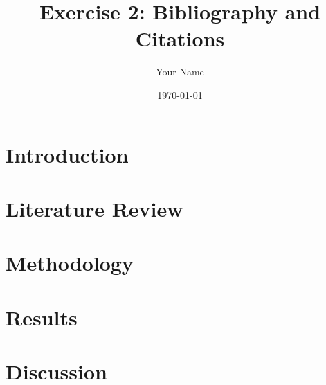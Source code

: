 \documentclass{article}
\title{Exercise 2: Bibliography and Citations}
\author{Your Name}
\date{\today}
\begin{document}
\maketitle

\section{Introduction}

\section{Literature Review}

\section{Methodology}

\section{Results}

\section{Discussion}

\end{document}
